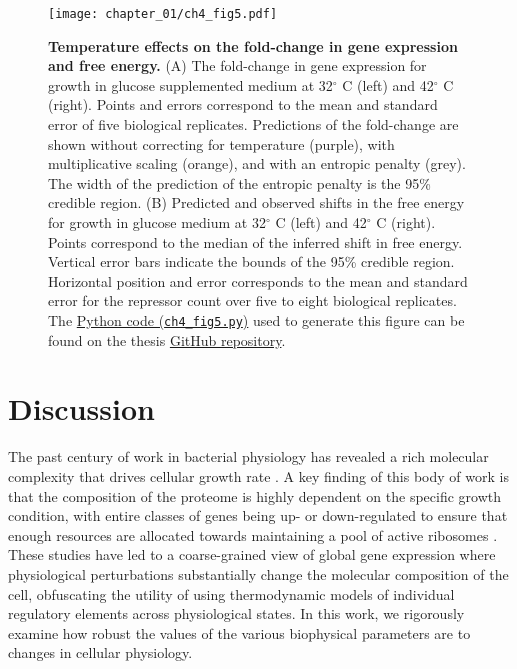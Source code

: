 \documentclass[12pt]{caltech_thesis}
\begin{document}
\hypertarget{fig:deltaF_temp}{%
\begin{figure}
\centering
\texttt{[image: chapter\_01/ch4\_fig5.pdf]}
\caption[{Temperature effects on the fold-change in gene expression and
free energy.}]{\textbf{Temperature effects on the fold-change in gene
expression and free energy.} (A) The fold-change in gene expression for
growth in glucose supplemented medium at 32\(^\circ\) C (left) and
42\(^\circ\) C (right). Points and errors correspond to the mean and
standard error of five biological replicates. Predictions of the
fold-change are shown without correcting for temperature (purple), with
multiplicative scaling (orange), and with an entropic penalty (grey).
The width of the prediction of the entropic penalty is the 95\% credible
region. (B) Predicted and observed shifts in the free energy for growth
in glucose medium at 32\(^\circ\) C (left) and 42\(^\circ\) C (right).
Points correspond to the median of the inferred shift in free energy.
Vertical error bars indicate the bounds of the 95\% credible region.
Horizontal position and error corresponds to the mean and standard error
for the repressor count over five to eight biological replicates. The
\href{https://github.com/gchure/phd/blob/master/src/chapter_04/code/ch4_fig5.py}{Python
code (\texttt{ch4\_fig5.py})} used to generate this figure can be found
on the thesis \href{https://github.com/gchure/phd}{GitHub repository}.}
\label{fig:deltaF_temp}
\end{figure}
}

\hypertarget{discussion-2}{%
\section{Discussion}\label{discussion-2}}

The past century of work in bacterial physiology has revealed a rich
molecular complexity that drives cellular growth rate
\autocite{jun2018}. A key finding of this body of work is that the
composition of the proteome is highly dependent on the specific growth
condition, with entire classes of genes being up- or down-regulated to
ensure that enough resources are allocated towards maintaining a pool of
active ribosomes \autocite{hui2015,scott2014}. These studies have led to
a coarse-grained view of global gene expression where physiological
perturbations substantially change the molecular composition of the
cell, obfuscating the utility of using thermodynamic models of
individual regulatory elements across physiological states. In this
work, we rigorously examine how robust the values of the various
biophysical parameters are to changes in cellular physiology.
\end{document}
